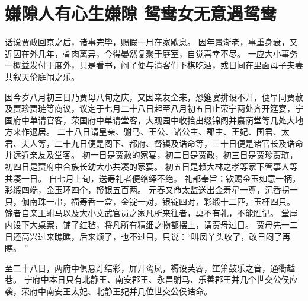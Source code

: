 \chapter{嫌隙人有心生嫌隙 \quad 鸳鸯女无意遇鸳鸯}
\par
话说贾政回京之后，诸事完毕，赐假一月在家歇息。
因年景渐老，事重身衰，又近因在外几年，骨肉离异，今得晏然复聚于庭室，自觉喜幸不尽。
一应大小事务一概益发付于度外，只是看书，闷了便与清客们下棋吃酒，或日间在里面母子夫妻共叙天伦庭闱之乐。
\par
因今岁八月初三日乃贾母八旬之庆，又因亲友全来，恐筵宴排设不开，便早同贾赦及贾珍贾琏等商议，议定于七月二十八日起至八月初五日止荣宁两处齐开筵宴，宁国府中单请官客，荣国府中单请堂客，大观园中收拾出缀锦阁并嘉荫堂等几处大地方来作退居。
二十八日请皇亲、驸马、王公、诸公主、郡主、王妃、国君、太君、夫人等，二十九日便是阁下、都府、督镇及诰命等，三十日便是诸官长及诰命并远近亲友及堂客。
初一日是贾赦的家宴，初二日是贾政，初三日是贾珍贾琏，初四日是贾府中合族长幼大小共凑的家宴。
初五日是赖大林之孝等家下管事人等共凑一日。
自七月上旬，送寿礼者便络绎不绝。
礼部奉旨：钦赐金玉如意一柄，彩缎四端，金玉环四个，帑银五百两。
元春又命太监送出金寿星一尊，沉香拐一只，伽南珠一串，福寿香一盒，金锭一对，银锭四对，彩缎十二匹，玉杯四只。
馀者自亲王驸马以及大小文武官员之家凡所来往者，莫不有礼，不能胜记。
堂屋内设下大桌案，铺了红毡，将凡所有精细之物都摆上，请贾母过目。
贾母先一二日还高兴过来瞧瞧，后来烦了，也不过目，只说：“叫凤丫头收了，改日闷了再瞧。
”\par
至二十八日，两府中俱悬灯结彩，屏开鸾凤，褥设芙蓉，笙箫鼓乐之音，通衢越巷。
宁府中本日只有北静王、南安郡王、永昌驸马、乐善郡王并几个世交公侯应袭，荣府中南安王太妃、北静王妃并几位世交公侯诰命。
